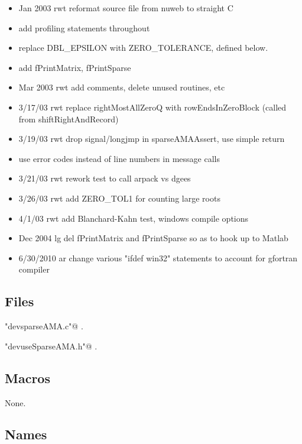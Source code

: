 \documentclass[12pt]{article}
\begin{document}
\begin{itemize}
\item  Jan 2003 	rwt reformat source file from nuweb to straight C
\item  add profiling statements throughout
\item replace DBL\_EPSILON with ZERO\_TOLERANCE, defined below.
\item   add fPrintMatrix, fPrintSparse      
\item  Mar 2003 	rwt add comments, delete unused routines, etc 
\item  3/17/03		rwt replace rightMostAllZeroQ with rowEndsInZeroBlock               (called from shiftRightAndRecord) 
\item  3/19/03     rwt drop signal/longjmp in sparseAMAAssert, use simple return  
\item  use error codes instead of line numbers in message calls   
\item  3/21/03		rwt rework test to call arpack vs dgees    
\item  3/26/03     rwt add ZERO\_TOL1 for counting large roots      
\item  4/1/03	 rwt add Blanchard-Kahn test, windows compile options  
\item  Dec 2004	lg	del fPrintMatrix and fPrintSparse so as to hook up to Matlab
\item  6/30/2010	ar 	change various "ifdef win32" statements to account for gfortran compiler 
\end{itemize}

\subsection{Files}
\label{sec:files}




{\small\begin{list}{}{\setlength{\itemsep}{-\parsep}\setlength{\itemindent}{-\leftmargin}}
\item \verb@"devsparseAMA.c"@ {\footnotesize {\NWtxtDefBy} .
}
\item \verb@"devuseSparseAMA.h"@ {\footnotesize {\NWtxtDefBy} .}
\end{list}}


\subsection{Macros}
\label{sec:macros}


None.




\subsection{Names}
\label{sec:names}












\end{document}
